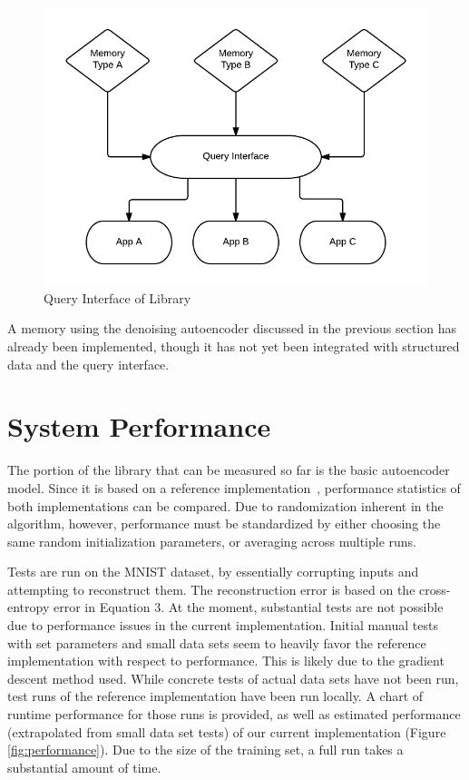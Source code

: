 \documentclass{sig-alternate}
\begin{document}
\begin{figure}[h]
	\begin{center}
		\includegraphics[width=1\linewidth]{queryint}
	\end{center}
	\vspace{-12pt}
	\caption{Query Interface of Library}
	\label{fig:queryint}
\end{figure}

A memory using the denoising autoencoder discussed in the previous section 
has already been implemented, though it has not yet been integrated with
structured data and the query interface.

\section{System Performance}
\label{sec:sysperformance}

The portion of the library that can be measured so far is the basic autoencoder model. 
Since it is based on a reference implementation~\cite{denoise}, performance statistics of both
implementations can be compared. Due to randomization inherent in the algorithm, however, 
performance must be standardized by either choosing the same random initialization parameters, or 
averaging across multiple runs. 

Tests are run on the MNIST dataset, by essentially corrupting inputs and 
attempting to reconstruct them. 
The reconstruction error is based on the cross-entropy error in Equation 3. 
At the moment, substantial tests are not possible due to performance issues in the current 
implementation. Initial manual tests with set parameters and small data sets seem to heavily favor 
the reference implementation with respect to performance. This is likely due to the gradient descent
method used. While concrete tests of actual data sets have not 
been run, test runs of the reference implementation have been run locally. A chart of runtime
performance for those runs is provided, as well as estimated performance (extrapolated from
small data set tests) of our current 
implementation (Figure \ref{fig:performance}). Due to the size
of the training set, a full run takes a substantial amount
of time. 
\end{document}

